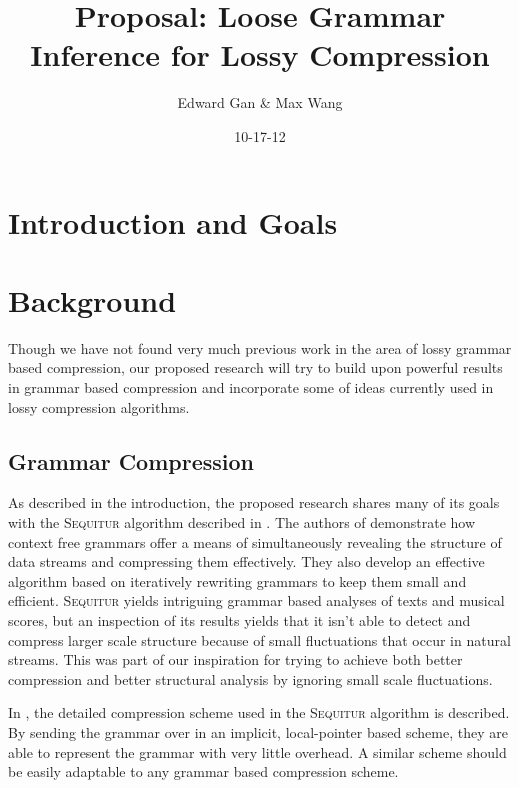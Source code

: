 \documentclass[11pt]{article}
\newcommand{\Sequitur}{\textsc{Sequitur}\xspace}
\begin{document}


\title{Proposal: Loose Grammar Inference for Lossy Compression}
\author{Edward Gan \& Max Wang}
\date{10-17-12}
\maketitle

\section{Introduction and Goals}

\section{Background}

Though we have not found very much previous work in the area of lossy grammar
based compression, our proposed research will try to build upon powerful
results in grammar based compression and incorporate some of ideas currently
used in lossy compression algorithms.

\subsection{Grammar Compression}

As described in the introduction, the proposed research shares many of its
goals with the \Sequitur algorithm described in \cite{sequitur}. The authors of
\cite{sequitur} demonstrate how context free grammars offer a means of
simultaneously revealing the structure of data streams and compressing them
effectively. They also develop an effective algorithm based on iteratively
rewriting grammars to keep them small and efficient. \Sequitur yields
intriguing grammar based analyses of texts and musical scores, but an
inspection of its results yields that it isn't able to detect and compress
larger scale structure because of small fluctuations that occur in natural
streams. This was part of our inspiration for trying to achieve both better
compression and better structural analysis by ignoring small scale
fluctuations.

In \cite{sequitur2}, the detailed compression scheme used in the \Sequitur
algorithm is described.  By sending the grammar over in an implicit,
local-pointer based scheme, they are able to represent the grammar with very
little overhead. A similar scheme should be easily adaptable to any grammar
based compression scheme.
\end{document}
